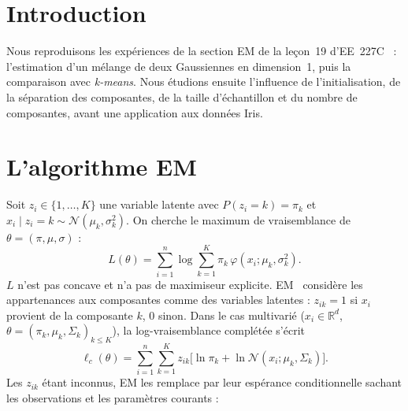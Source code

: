 \documentclass[a4paper,11pt]{article}
\begin{document}


\section{Introduction}
Nous reproduisons les expériences de la section EM de la leçon~19 d'EE~227C~\cite{ee227c} : l'estimation d'un mélange
de deux Gaussiennes en dimension~1, puis la comparaison avec \emph{k-means}. Nous étudions ensuite l'influence de
l'initialisation, de la séparation des composantes, de la taille d'échantillon et du nombre de composantes, avant une
application aux données Iris.

\section{L'algorithme EM}
Soit $z_i\in\{1,\dots,K\}$ une variable latente avec $P(z_i=k)=\pi_k$ et $x_i\mid z_i=k\sim\mathcal N(\mu_k,\sigma_k^2)$.
On cherche le maximum de vraisemblance de $\theta=(\pi,\mu,\sigma)$ :
\[
L(\theta)=\sum_{i=1}^n\log\sum_{k=1}^K\pi_k\,\varphi(x_i;\mu_k,\sigma_k^2).
\]
$L$ n'est pas concave et n'a pas de maximiseur explicite. EM~\cite{ssbd} considère les appartenances aux
composantes comme des variables latentes : $z_{ik}=1$ si $x_i$ provient de la composante $k$, $0$ sinon. Dans le cas
multivarié ($x_i\in\mathbb R^d$, $\theta=(\pi_k,\mu_k,\Sigma_k)_{k\le K}$), la log-vraisemblance complétée s'écrit
\[
\ell_c(\theta)=\sum_{i=1}^n\sum_{k=1}^K z_{ik}\Big[\ln\pi_k+\ln\mathcal N(x_i;\mu_k,\Sigma_k)\Big].
\]
Les $z_{ik}$ étant inconnus, EM les remplace par leur espérance conditionnelle sachant les observations et les
paramètres courants :
\end{document}
